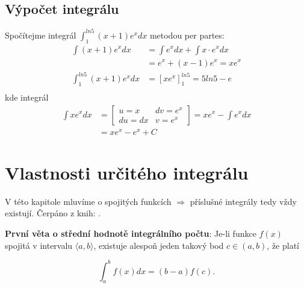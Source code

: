   \subsection{Výpočet integrálu}
      \begin{example}
        Spočítejme integrál $\displaystyle \int_1^{ln5}{(x+1)e^xdx}$  metodou per partes: 
        \begin{align*}
          \int{(x+1)e^xdx} &= \int{e^xdx}+\int{x\cdot e^xdx}     \\
                           &= e^x + (x-1)e^x = xe^x              \\
          \int_1^{ln5}{(x+1)e^xdx} &= [xe^x]_1^{ln5} = 5ln5-e    \\
        \end{align*}
        kde integrál
        \begin{align*}
            \int{xe^xdx}
              &=\left[\begin{array}{cc}
                  u=x   & dv=e^x \\ [-1em]
                  du=dx & v=e^x
                \end{array}\right]= xe^x-\int{e^xdx}  \\
              &= xe^x - e^x+C
        \end{align*}
      \end{example}

\section{Vlastnosti určitého integrálu}
  V této kapitole mluvíme o spojitých funkcích $\Rightarrow$ příslušné integrály tedy vždy
  existují. Čerpáno z knih:
  \cite{Knichal}.

  \begin{lemma}
    \textbf{První věta o střední hodnotě integrálního počtu}: Je-li funkce $f(x)$ spojitá v
    intervalu $\langle a, b\rangle$, existuje alespoň jeden takový bod $c\in(a, b)$, že platí

    \begin{equation}\label{MA:eq_av1}
      \int_a^b f(x)dx = (b-a)f(c).
    \end{equation}
  \end{lemma}

